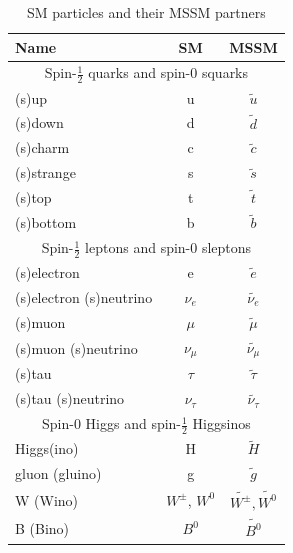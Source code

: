 			\begin{table}[!thp]
				\centering
				\caption{SM particles and their \gls{MSSM} partners \cite{pdg}}
				\begin{tabular}{| l | c | c |}
				\hline
				Name 				& \gls{SM} 	& \gls{MSSM} \\[1ex] \hline
				\multicolumn{3}{|c|}{Spin-$\frac{1}{2}$ quarks and spin-$0$ squarks} \\[1ex] \hline
				(s)up 				& u 	& $\tilde{u}$ \\[1ex] \hline
				(s)down 			& d 	& $\tilde{d}$ \\[1ex] \hline
				(s)charm 			& c 	& $\tilde{c}$ \\[1ex] \hline
				(s)strange 			& s		& $\tilde{s}$ \\[1ex] \hline
				(s)top 				& t 	& $\tilde{t}$ \\[1ex] \hline
				(s)bottom 			& b 	& $\tilde{b}$ \\[1ex] \hline
				\multicolumn{3}{|c|}{Spin-$\frac{1}{2}$ leptons and spin-$0$ sleptons} \\[1ex] \hline
				(s)electron 		& e 	& $\tilde{e}$ \\[1ex] \hline
				(s)electron (s)neutrino 	& $\nu_e$ 	& $\widetilde{\nu_e}$ \\[1ex] \hline
				(s)muon 			& $\mu$ 	& $\tilde{\mu}$ \\[1ex] \hline
				(s)muon (s)neutrino & $\nu_\mu$ 	& $\widetilde{\nu_\mu}$ \\[1ex] \hline
				(s)tau 				& $\tau$ 	& $\tilde{\tau}$ \\[1ex] \hline
				(s)tau (s)neutrino 	& $\nu_\tau$ 	& $\widetilde{\nu_\tau}$ \\[1ex] \hline
				\multicolumn{3}{|c|}{Spin-$0$ Higgs and spin-$\frac{1}{2}$ Higgsinos} \\[1ex] \hline
				Higgs(ino)			& H 	& $\tilde{H}$ \\[1ex] \hline
				gluon (gluino) 		& g 	& $\tilde{g}$ \\[1ex] \hline
				W (Wino) 			& $W^{\pm}$, $W^0$ & $\widetilde{W^\pm}, \widetilde{W^0}$ \\[1ex] \hline
				B (Bino) 			& $B^0$ & $\widetilde{B^0}$ \\[1ex] \hline

 				\end{tabular}
				\label{tab:MSSM}
			\end{table}

